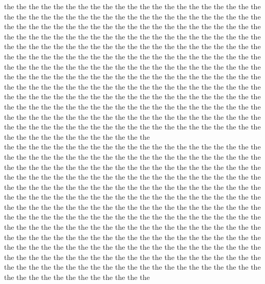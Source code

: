 the the the the the the the the the the the the the the the the the the the the the the the the the the the the the the the the the the the the the the the the the the the the the the the the the the the the the the the the the the the the the the the the the the the the the the the the the the the the the the the the the the the the the the the the the the the the the the the the the the the the the the the the the the the the the the the the the the the the the the the the the the the the the the the the the the the the the the the the the the the the the the the the the the the the the the the the the the the the the the the the the the the the the the the the the the the the the the the the the the the the the the the the the the the the the the the the the the the the the the the the the the the the the the the the the the the the the the the the the the the the the the the the the the the the the the the the the the the the the the the the the the the the the the the the the the the the the the the the the the the the the the the the the the the the the the the the the the the the the the the the the the the the the\\
the the the the the the the the the the the the the the the the the the the the the the the the the the the the the the the the the the the the the the the the the the the the the the the the the the the the the the the the the the the the the the the the the the the the the the the the the the the the the the the the the the the the the the the the the the the the the the the the the the the the the the the the the the the the the the the the the the the the the the the the the the the the the the the the the the the the the the the the the the the the the the the the the the the the the the the the the the the the the the the the the the the the the the the the the the the the the the the the the the the the the the the the the the the the the the the the the the the the the the the the the the the the the the the the the the the the the the the the the the the the the the the the the the the the the the the the the the the the the the the the the the the the the the the the the the the the the the the the the the the the the the the the the the the the the the the the the the the the the the the the the the the the the\\
